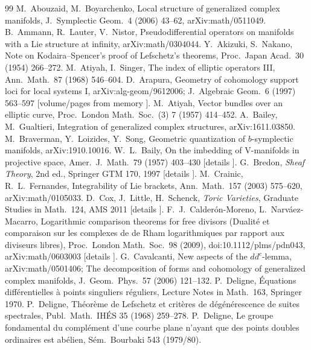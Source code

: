 \begin{thebibliography}{99}\small
{} M.\ Abouzaid, M.\ Boyarchenko, Local structure of generalized complex manifolds, J.\ Symplectic Geom.\ 4 (2006) 43--62, arXiv:math/0511049.
 B.\ Ammann, R.\ Lauter, V.\ Nistor, Pseudodifferential operators on manifolds with a Lie structure at infinity, arXiv:math/0304044.
 Y.\ Akizuki, S.\ Nakano, Note on Kodaira--Spencer's proof of Lefschetz's theorems, Proc.\ Japan Acad.\ 30 (1954) 266--272.
 M.\ Atiyah, I.\ Singer, The index of elliptic operators III, Ann.\ Math.\ 87 (1968) 546--604.
 D.\ Arapura, Geometry of cohomology support loci for local systems I, arXiv:alg-geom/9612006; J.\ Algebraic Geom.\ 6 (1997) 563--597 [volume/pages from memory \tQ].
 M.\ Atiyah, Vector bundles over an elliptic curve, Proc.\ London Math.\ Soc.\ (3) 7 (1957) 414--452.
 A.\ Bailey, M.\ Gualtieri, Integration of generalized complex structures, arXiv:1611.03850.
 M.\ Braverman, Y.\ Loizides, Y.\ Song, Geometric quantization of $b$-symplectic manifolds, arXiv:1910.10016.
 W.\ L.\ Baily, On the imbedding of V-manifolds in projective space, Amer.\ J.\ Math.\ 79 (1957) 403--430 [details \tQ].
 G.\ Bredon, \emph{Sheaf Theory}, 2nd ed., Springer GTM 170, 1997 [details \tQ].
 M.\ Crainic, R.\ L.\ Fernandes, Integrability of Lie brackets, Ann.\ Math.\ 157 (2003) 575--620, arXiv:math/0105033.
 D.\ Cox, J.\ Little, H.\ Schenck, \emph{Toric Varieties}, Graduate Studies in Math.\ 124, AMS 2011 [details \tQ].
 F.\ J.\ Calder\'on-Moreno, L.\ Narv\'aez-Macarro, Logarithmic comparison theorems for free divisors (Dualit\'e et comparaison sur les complexes de de Rham logarithmiques par rapport aux diviseurs libres), Proc.\ London Math.\ Soc.\ 98 (2009), doi:10.1112/plms/pdn043, arXiv:math/0603003 [details \tQ].
 G.\ Cavalcanti, New aspects of the $dd^c$-lemma, arXiv:math/0501406; The decomposition of forms and cohomology of generalized complex manifolds, J.\ Geom.\ Phys.\ 57 (2006) 121--132.
 P.\ Deligne, \'Equations diff\'erentielles \`a points singuliers r\'eguliers, Lecture Notes in Math.\ 163, Springer 1970.
 P.\ Deligne, Th\'eor\`eme de Lefschetz et crit\`eres de d\'eg\'en\'erescence de suites spectrales, Publ.\ Math.\ IH\'ES 35 (1968) 259--278.
 P.\ Deligne, Le groupe fondamental du compl\'ement d'une courbe plane n'ayant que des points doubles ordinaires est ab\'elien, S\'em.\ Bourbaki 543 (1979/80).

\end{thebibliography}
